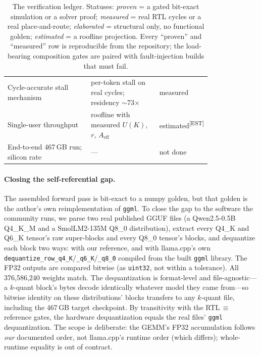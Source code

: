 \documentclass[11pt]{article}
\newcommand{\code}[1]{\texttt{#1}}
\newcommand{\est}{\textsuperscript{[EST]}}
\begin{document}
\begin{table}[t]
\begin{tabular}{@{}p{0.44\linewidth}p{0.36\linewidth}l@{}}
Cycle-accurate stall mechanism & per-token stall on real cycles; residency $\sim$73$\times$ & measured \\
Single-user throughput & roofline with measured $U(K)$, $r$, $A_{\mathrm{eff}}$ & estimated\est \\
End-to-end 467\,GB run; silicon rate & --- & not done \\
\bottomrule
\end{tabular}
\caption{The verification ledger. Statuses: \emph{proven} = a gated bit-exact
simulation or a solver proof; \emph{measured} = real RTL cycles or a real
place-and-route; \emph{elaborated} = structural only, no functional golden;
\emph{estimated} = a roofline projection. Every ``proven'' and ``measured''
row is reproducible from the repository; the load-bearing composition gates
are paired with fault-injection builds that must fail.}
\label{tab:ledger}
\end{table}

\paragraph{Closing the self-referential gap.} The assembled forward pass is
bit-exact to a numpy golden, but that golden is the author's own
reimplementation of \code{ggml}. To close the gap to the software the community
runs, we parse two real published GGUF files (a Qwen2.5-0.5B Q4\_K\_M and a
SmolLM2-135M Q8\_0 distribution), extract every Q4\_K and Q6\_K tensor's raw
super-blocks and every Q8\_0 tensor's blocks, and dequantize each block two
ways: with our reference, and with llama.cpp's own
\code{dequantize\_row\_q4\_K}/\code{\_q6\_K}/\code{\_q8\_0} compiled from the
built \code{ggml} library. The FP32 outputs are compared bitwise (as
\code{uint32}, not within a tolerance). All 376{,}586{,}240 weights match.
The dequantization is format-level and file-agnostic---a $k$-quant block's
bytes decode identically whatever model they came from---so bitwise identity
on these distributions' blocks transfers to any $k$-quant file, including the
467\,GB target checkpoint. By transitivity with the
RTL$\,\equiv\,$reference gates, the hardware dequantization equals the real
files' \code{ggml} dequantization. The scope is deliberate: the GEMM's FP32
accumulation follows \emph{our} documented order, not llama.cpp's runtime
order (which differs); whole-runtime equality is out of contract.
\end{document}
